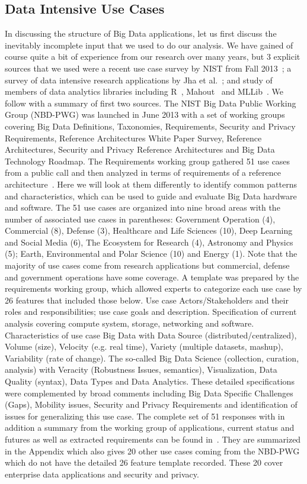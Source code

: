 \documentclass{acm_proc_article-sp}
\begin{document}
\subsection{Data Intensive Use Cases}
In discussing the structure of Big Data applications, let us first discuss the inevitably incomplete input that we used to do our analysis. We have gained of course quite a bit of experience from our research over many years, but 3 explicit sources that we used were a recent use case survey by NIST from Fall 2013~\cite{bb}; a survey of data intensive research applications by Jha et al.~\cite{b28,b26}; and study of members of data analytics libraries including R~\cite{b4}, Mahout~\cite{b1} and MLLib~\cite{b3}. We follow with a summary of first two sources.
The NIST Big Data Public Working Group (NBD-PWG) was launched in June 2013 with a set of working groups covering Big Data Definitions, Taxonomies, Requirements, Security and Privacy Requirements, Reference Architectures White Paper Survey, Reference Architectures, Security and Privacy Reference Architectures and Big Data Technology Roadmap. The Requirements working group gathered 51 use cases from a public call and then analyzed in terms of requirements of a reference architecture~\cite{b21}. Here we will look at them differently to identify common patterns and characteristics, which can be used to guide and evaluate Big Data hardware and software. The 51 use cases are organized into nine broad areas with the number of associated use cases in parentheses: Government Operation (4), Commercial (8), Defense (3), Healthcare and Life Sciences (10), Deep Learning and Social Media (6), The Ecosystem for Research (4), Astronomy and Physics (5); Earth, Environmental and Polar Science (10) and Energy (1). 
Note that the majority of use cases come from research applications but commercial, defense and government operations have some coverage. A template was prepared by the requirements working group, which allowed experts to categorize each use case by 26 features that included those below.
Use case Actors/Stakeholders and their roles and responsibilities; use case goals and description. Specification of current analysis covering compute system, storage, networking and software.  Characteristics of use case Big Data with Data Source (distributed/centralized), Volume (size), Velocity (e.g. real time), Variety (multiple datasets, mashup), Variability (rate of change). The so-called Big Data Science (collection, curation, analysis) with Veracity (Robustness Issues, semantics), Visualization, Data Quality (syntax), Data Types and Data Analytics. These detailed specifications were complemented by broad comments including Big Data Specific Challenges (Gaps), Mobility issues, Security and Privacy Requirements and identification of issues for generalizing this use case.
The complete set of 51 responses with in addition a summary from the working group of applications, current status and futures as well as extracted requirements can be found in~\cite{b21}. They are summarized in the Appendix which also gives 20 other use cases coming from the NBD-PWG which do not have the detailed 26 feature template recorded. These 20 cover enterprise data applications and security and privacy.
\end{document}
